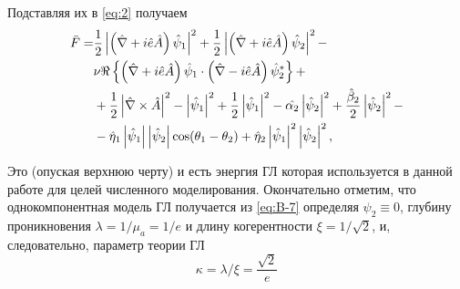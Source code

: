 Подставляя их в \eqref{eq:2} получаем
\begin{align}
  \bar{F} = & \frac{1}{2}\left| \left( \hat{\nabla} + i\hat{e}\hat{A} \right)
    \hat{\psi}_1 \right|^2 + \frac{1}{2}\left| \left( \hat{\nabla} + i\hat{e}\hat{A}
    \right)\hat{\psi}_2 \right|^2 - \nonumber \\ 
  & \nu\Re\left\{ \left( \hat{\nabla} + i\hat{e}\hat{A}
    \right) \hat{\psi}_1 \cdot \left( \hat{\nabla} - i\hat{e}\hat{A} \right)
    \hat{\psi}^*_2 \right\} + \nonumber \\
  & + \frac{1}{2}\left| \hat{\nabla}\times\hat{A} \right|^2 - \left| \hat{\psi}_1 \right|^2 +
    \frac{1}{2}\left| \hat{\psi}_1 \right|^2 - \hat{\alpha_2}\left| \hat{\psi}_2 \right|^2 +
    \frac{\hat{\beta}_2}{2}\left| \hat{\psi}_2 \right|^2 - \nonumber \\
  & - \hat{\eta}_1\left| \hat{\psi}_1 \right|\left| \hat{\psi}_2 \right| \cos(\theta_1 - \theta_2)
    + \hat{\eta}_2\left| \hat{\psi}_1 \right|^2 \left| \hat{\psi}_2 \right|^2, \label{eq:B-7}
\end{align}

Это (опуская верхнюю черту) и есть энергия ГЛ которая используется в данной 
работе для целей численного моделирования. Окончательно отметим, что 
однокомпонентная модель ГЛ получается из \eqref{eq:B-7} определяя 
\( \psi_2 \equiv 0 \), глубину проникновения \( \lambda = 1/\mu_a = 1/e \) и 
длину когерентности \( \xi = 1/\sqrt{2} \), и, следовательно, параметр 
теории ГЛ
\begin{equation}
  \kappa = \lambda/\xi = \frac{\sqrt{2}}{e}
  \label{eq:B-8}
\end{equation}

\newpage